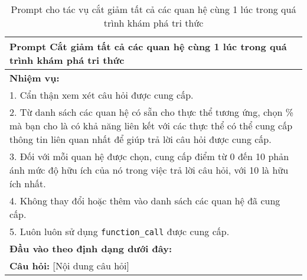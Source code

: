 \begin{table}[ht]
    \centering
    \caption{Prompt cho tác vụ cắt giảm tất cả các quan hệ cùng 1 lúc trong quá trình khám phá tri thức}
    \label{tab:relation_prune_prompt_all}
    \small{\begin{tabular}{p{}}
            \toprule
            \textbf{Prompt Cắt giảm tất cả các quan hệ cùng 1 lúc trong quá trình khám phá tri thức}                                                                                                               \\
            \midrule
            \textbf{Nhiệm vụ:}                                                                                                                                                                                     \\
            1. Cẩn thận xem xét câu hỏi được cung cấp.                                                                                                                                                             \\
            2. Từ danh sách các quan hệ có sẵn cho thực thể tương ứng, chọn \% mà bạn cho là có khả năng liên kết với các thực thể có thể cung cấp thông tin liên quan nhất để giúp trả lời câu hỏi được cung cấp. \\
            3. Đối với mỗi quan hệ được chọn, cung cấp điểm từ 0 đến 10 phản ánh mức độ hữu ích của nó trong việc trả lời câu hỏi, với 10 là hữu ích nhất.                                                         \\
            4. Không thay đổi hoặc thêm vào danh sách các quan hệ đã cung cấp.                                                                                                                                     \\
            5. Luôn luôn sử dụng \texttt{function\_call} được cung cấp.                                                                                                                                            \\
            \textbf{Đầu vào theo định dạng dưới đây:}                                                                                                                                                              \\
            \textbf{Câu hỏi:} [Nội dung câu hỏi]                                                                                                                                                                   \\

\end{tabular}}
\end{table}
